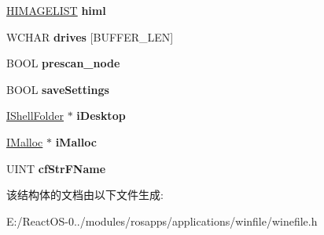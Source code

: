 \begin{DoxyCompactItemize}
\hyperlink{struct___i_m_a_g_e_l_i_s_t}{H\+I\+M\+A\+G\+E\+L\+I\+ST} {\bfseries himl}
\item 
\mbox{\label{struct_w_i_n_e_f_i_l_e___g_l_o_b_a_l_s_a5eac6ceaa3b80dcc45d39d0e271f9aa0}} 
W\+C\+H\+AR {\bfseries drives} \mbox{[}B\+U\+F\+F\+E\+R\+\_\+\+L\+EN\mbox{]}
\item 
\mbox{\label{struct_w_i_n_e_f_i_l_e___g_l_o_b_a_l_s_aafacd25cdee966c3ef678d5657c5eb08}} 
B\+O\+OL {\bfseries prescan\+\_\+node}
\item 
\mbox{\label{struct_w_i_n_e_f_i_l_e___g_l_o_b_a_l_s_aa6f19a27b83d2108cb85f7e302228526}} 
B\+O\+OL {\bfseries save\+Settings}
\item 
\mbox{\label{struct_w_i_n_e_f_i_l_e___g_l_o_b_a_l_s_a17a1c31ebd6f1072c8a1e7022f754447}} 
\hyperlink{interface_i_shell_folder}{I\+Shell\+Folder} $\ast$ {\bfseries i\+Desktop}
\item 
\mbox{\label{struct_w_i_n_e_f_i_l_e___g_l_o_b_a_l_s_a90255df146cc65299cfb51938ef722c7}} 
\hyperlink{interface_i_malloc}{I\+Malloc} $\ast$ {\bfseries i\+Malloc}
\item 
\mbox{\label{struct_w_i_n_e_f_i_l_e___g_l_o_b_a_l_s_a226df0093ed6a5c757998a05ce015810}} 
U\+I\+NT {\bfseries cf\+Str\+F\+Name}
\end{DoxyCompactItemize}


该结构体的文档由以下文件生成\+:\begin{DoxyCompactItemize}
\item 
E\+:/\+React\+O\+S-\/0../modules/rosapps/applications/winfile/winefile.\+h\end{DoxyCompactItemize}

